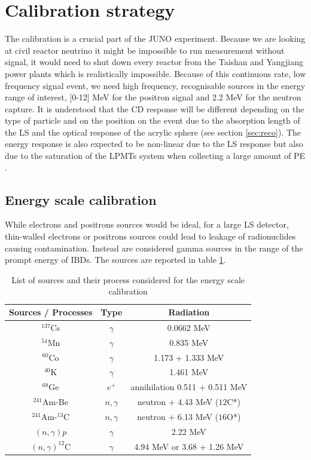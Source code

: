 \section{Calibration strategy}

The calibration is a crucial part of the JUNO experiment. Because we are looking at civil reactor neutrino it might be impossible to run measurement without signal, it would need to shut down every reactor from the Taishan and Yangjiang power plants which is realistically impossible. Because of this continuous rate, low frequency signal event, we need high frequency, recognisable sources in the energy range of interest, [0-12] MeV for the positron signal and 2.2 MeV for the neutron capture.
It is understood that the CD response will be different depending on the type of particle and on the position on the event due to the absorption length of the LS and the optical response of the acrylic sphere (see section \ref{sec:reco}). The energy response is also expected to be non-linear due to the LS response \cite{bay_optimization_2020} but also due to the saturation of the LPMTs system when collecting a large amount of PE \cite{han_dual_2021}.

\subsection{Energy scale calibration}

While electrons and positrons sources would be ideal, for a large LS detector, thin-walled electrons or positrons sources could lead to leakage of radionuclides causing contamination. Instead are considered gamma sources in the range of the prompt energy of IBDs. The sources are reported in table \ref{tab:calib_source}.

\begin{table}[ht]
  \centering
  \begin{tabular}{|c|c|c|}
    \hline
    Sources / Processes & Type & Radiation \\
    \hline
    $^{137}$Cs          & $\gamma$ & 0.0662 MeV \\
    $^{54}$Mn           & $\gamma$ & 0.835 MeV \\
    $^{60}$Co           & $\gamma$ & 1.173 + 1.333 MeV \\
    $^{40}$K            & $\gamma$ & 1.461 MeV \\
    $^{68}$Ge           & $e^{+}$  &  annihilation 0.511 + 0.511 MeV \\
    $^{241}$Am-Be       & $n,\gamma$ & neutron + 4.43 MeV (${12}$C*) \\
    $^{241}$Am-$^{13}$C & $n,\gamma$ & neutron + 6.13 MeV (${16}$O*) \\
    $(n, \gamma)p$      & $\gamma$ & 2.22 MeV \\
    $(n, \gamma)^{12}$C & $\gamma$ & 4.94 MeV or 3.68 + 1.26 MeV \\
    \hline
  \end{tabular}
  \caption{List of sources and their process considered for the energy scale calibration}
  \label{tab:calib_source}
\end{table}

